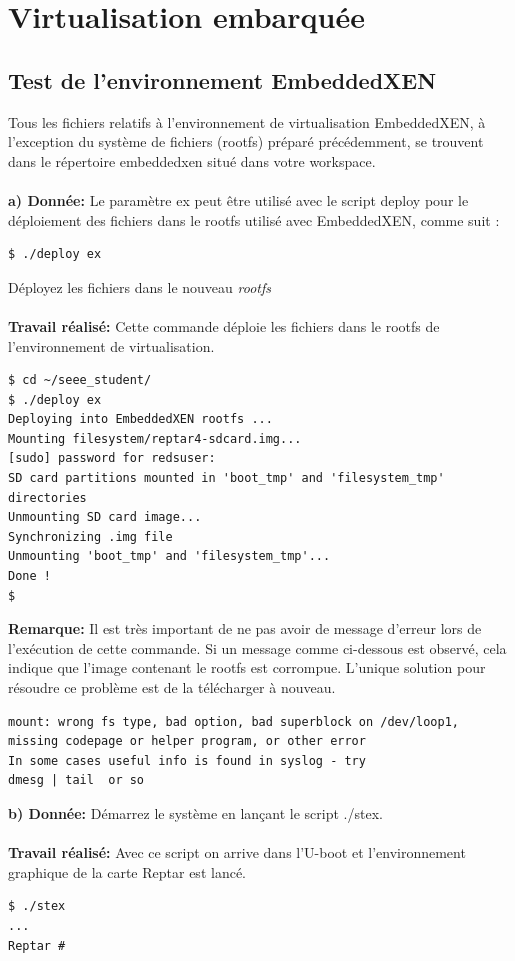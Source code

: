 \newpage
\section{Virtualisation embarquée}
\subsection{Test de l'environnement EmbeddedXEN}
Tous les fichiers relatifs à l'environnement de virtualisation EmbeddedXEN, à l'exception du système
de fichiers (rootfs) préparé précédemment, se trouvent dans le répertoire embeddedxen situé dans votre
workspace.\\\\
\textbf{a) Donnée: }Le paramètre ex peut être utilisé avec le script deploy pour le déploiement des fichiers dans le rootfs
utilisé avec EmbeddedXEN, comme suit :
\begin{lstlisting}
$ ./deploy ex
\end{lstlisting}
Déployez les fichiers dans le nouveau \textit{rootfs}\\\\
\textbf{Travail réalisé: }Cette commande déploie les fichiers dans le rootfs de l'environnement de virtualisation.
\begin{lstlisting}
$ cd ~/seee_student/
$ ./deploy ex
Deploying into EmbeddedXEN rootfs ...
Mounting filesystem/reptar4-sdcard.img...
[sudo] password for redsuser: 
SD card partitions mounted in 'boot_tmp' and 'filesystem_tmp' directories
Unmounting SD card image...
Synchronizing .img file
Unmounting 'boot_tmp' and 'filesystem_tmp'...
Done !
$ 
\end{lstlisting}
\textbf{Remarque: }Il est très important de ne pas avoir de message d'erreur lors de l'exécution de cette commande. Si un message comme ci-dessous est observé, cela indique que l'image contenant le rootfs est corrompue. L'unique solution pour résoudre ce problème est de la télécharger à nouveau.
\begin{lstlisting}
mount: wrong fs type, bad option, bad superblock on /dev/loop1,
missing codepage or helper program, or other error
In some cases useful info is found in syslog - try
dmesg | tail  or so
\end{lstlisting}
\textbf{b) Donnée: }Démarrez le système en lançant le script ./stex.\\\\
\textbf{Travail réalisé: }Avec ce script on arrive dans l'U-boot et l'environnement graphique de la carte Reptar est lancé.
\begin{lstlisting}
$ ./stex
...
Reptar # 
\end{lstlisting}
